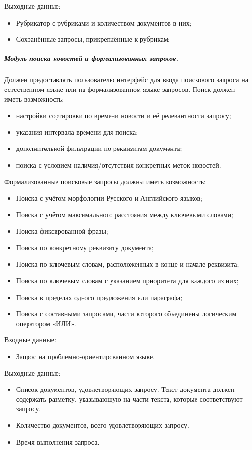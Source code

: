 Выходные данные:
\begin{itemize}
\item Рубрикатор с рубриками и количеством документов в них;
\item Сохранённые запросы, прикреплённые к рубрикам;
\end{itemize}

\subparagraph{Модуль поиска новостей и формализованных запросов.}

Должен предоставлять пользователю интерфейс для ввода поискового запроса на
естественном языке или на формализованном языке запросов. Поиск должен
иметь возможность:
\begin{itemize}
\item настройки сортировки по времени новости и её релевантности запросу;
\item указания интервала времени для поиска;
\item дополнительной фильтрации по реквизитам документа;
\item поиска с условием наличия/отсутствия конкретных меток новостей.
\end{itemize}

Формализованные поисковые запросы должны иметь возможность:
\begin{itemize}
\item Поиска с учётом морфологии Русского и Английского языков;
\item Поиска с учётом максимального расстояния между ключевыми словами;
\item Поиска фиксированной фразы;
\item Поиска по конкретному реквизиту документа;
\item Поиска по ключевым словам, расположенных в конце и начале реквизита;
\item Поиска по ключевым словам с указанием приоритета для каждого из них;
\item Поиска в пределах одного предложения или параграфа;
\item Поиска с составными запросами, части которого объединены логическим оператором «ИЛИ».
\end{itemize}

Входные данные:
\begin{itemize}
\item Запрос на проблемно-ориентированном языке.
\end{itemize}

Выходные данные:
\begin{itemize}
\item Список документов, удовлетворяющих запросу. Текст документа должен содержать разметку, указывающую на части текста, которые соответствуют запросу.
\item Количество документов, всего удовлетворяющих запросу.
\item Время выполнения запроса.
\end{itemize}

